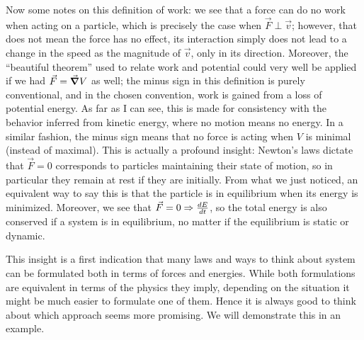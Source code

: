 \documentclass[../class_mech_main.tex]{subfiles}
\begin{document}


Now some notes on this definition of work: we see that a force can do no work when acting on a particle, which is precisely the case when $\vec{F} \perp \vec{v}$; however, that does not mean the force has no effect, its interaction simply does not lead to a change in the speed as the magnitude of $\vec{v}$, only in its direction. Moreover, the \enquote{beautiful theorem} used to relate work and potential could very well be applied if we had $\vec{F} = \grad V$ as well; the minus sign in this definition is purely conventional, and in the chosen convention, work is gained from a loss of potential energy. As far as I can see, this is made for consistency with the behavior inferred from kinetic energy, where no motion means no energy. In a similar fashion, the minus sign means that no force is acting when $V$ is minimal (instead of maximal). This is actually a profound insight: Newton's laws dictate that $\vec{F} = 0$ corresponds to particles maintaining their state of motion, so in particular they remain at rest if they are initially. From what we just noticed, an equivalent way to say this is that the particle is in equilibrium when its energy is minimized. Moreover, we see that $\vec{F} = 0 \Rightarrow \dv{E}{t}$, so the total energy is also conserved if a system is in equilibrium, no matter if the equilibrium is static or dynamic.


This insight is a first indication that many laws and ways to think about system can be formulated both in terms of forces and energies. While both formulations are equivalent in terms of the physics they imply, depending on the situation it might be much easier to formulate one of them. Hence it is always good to think about which approach seems more promising. We will demonstrate this in an example.
\end{document}
